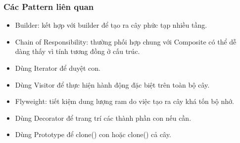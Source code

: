 \subsubsection{Các Pattern liên quan}
\begin{itemize}
    \item Builder: kết hợp với builder để tạo ra cây phức tạp nhiều tầng.
    \item Chain of Responsibility: thường phối hợp chung với Composite có thể dễ dàng thấy vì tính tương đồng ở cấu trúc.
    \item Dùng Iterator để duyệt con.
    \item Dùng Visitor để thực hiện hành động đặc biệt trên toàn bộ cây.
    \item Flyweight: tiết kiệm dung lượng ram do việc tạo ra cây khá tốn bộ nhớ.
    \item Dùng Decorator để trang trí các thành phần con nếu cần.
    \item Dùng Prototype để clone() con hoặc clone() cả cây.
\end{itemize}